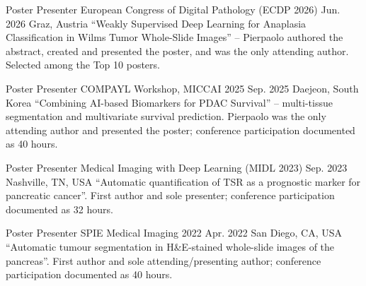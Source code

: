
\begin{cventries}
\cventry
  {Poster Presenter}
  {European Congress of Digital Pathology (ECDP 2026)}
  {Jun. 2026}
  {Graz, Austria}
  {``Weakly Supervised Deep Learning for Anaplasia Classification in Wilms Tumor Whole-Slide Images'' -- Pierpaolo authored the abstract, created and presented the poster, and was the only attending author. Selected among the Top 10 posters.}

\cventry
  {Poster Presenter}
  {COMPAYL Workshop, MICCAI 2025}
  {Sep. 2025}
  {Daejeon, South Korea}
  {``Combining AI-based Biomarkers for PDAC Survival'' -- multi-tissue segmentation and multivariate survival prediction. Pierpaolo was the only attending author and presented the poster; conference participation documented as 40 hours.}

\cventry
  {Poster Presenter}
  {Medical Imaging with Deep Learning (MIDL 2023)}
  {Sep. 2023}
  {Nashville, TN, USA}
  {``Automatic quantification of TSR as a prognostic marker for pancreatic cancer''. First author and sole presenter; conference participation documented as 32 hours.}

\cventry
  {Poster Presenter}
  {SPIE Medical Imaging 2022}
  {Apr. 2022}
  {San Diego, CA, USA}
  {``Automatic tumour segmentation in H\&E-stained whole-slide images of the pancreas''. First author and sole attending/presenting author; conference participation documented as 40 hours.}
\end{cventries}
